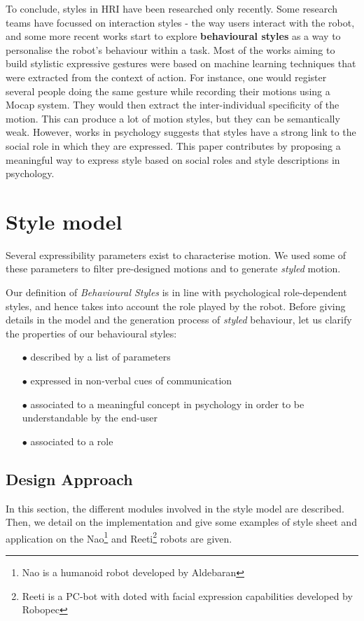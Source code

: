 \documentclass[a4paper,twocolumn]{svjour3}
\begin{document}
To conclude, styles in HRI have been researched only recently. 
Some research teams have focussed on interaction styles - the way users interact with the robot, and some more recent works start to explore \textbf{behavioural styles} as a way to personalise the robot's behaviour within a task. 
Most of the works aiming to build stylistic expressive gestures were based on machine learning techniques that were extracted from the context of action. 
For instance, one would register several people doing the same gesture while recording their motions using a Mocap system.
They would then extract the inter-individual specificity of the motion.
This can produce a lot of motion styles, but they can be semantically weak.
However, works in psychology suggests that styles have a strong link to the social role in which they are expressed. 
This paper contributes by proposing a meaningful way to express style based on social roles and style descriptions in psychology.

\section{Style model}
Several expressibility parameters exist to characterise motion. 
We used some of these parameters to filter pre-designed motions and to generate \textit{styled} motion.

Our definition of \emph{Behavioural Styles} is in line with psychological role-dependent styles, and hence takes into account the role played by the robot.
Before giving details in the model and the generation process of \textit{styled} behaviour, let us clarify the properties of our behavioural styles:
\begin{itemize}[noitemsep,nolistsep]
	\item[$\bullet$] described by a list of parameters
	\item[$\bullet$]  expressed in non-verbal cues of communication
	\item[$\bullet$]  associated to a meaningful concept in psychology in order to be understandable by the end-user
	\item[$\bullet$]  associated to a role
\end{itemize}


\subsection{Design Approach}
In this section, the different modules involved in the style model are described. 
Then, we detail on the implementation and give some examples of style sheet and application on the Nao\footnote{Nao is a humanoid robot developed by Aldebaran}  and Reeti\footnote{Reeti is a PC-bot with doted with facial expression capabilities developed by Robopec} robots are given.
\end{document}
